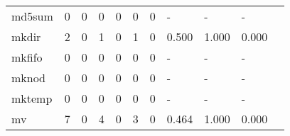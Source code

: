 \begin{longtable}{lp{1.2cm}p{1.2cm}p{1.2cm}p{1.2cm}p{1.2cm}p{1.2cm}p{1.2cm}p{1.2cm}p{1.2cm}p{1.2cm}}
md5sum    &                                     0 &                                                  0 &                                                0 &                                               0 &                                                0 &                                              0 &                                                  - &                                                  - &                                                  - \\
mkdir     &                                     2 &                                                  0 &                                                1 &                                               0 &                                                1 &                                              0 &                                              0.500 &                                              1.000 &                                              0.000 \\
mkfifo    &                                     0 &                                                  0 &                                                0 &                                               0 &                                                0 &                                              0 &                                                  - &                                                  - &                                                  - \\
mknod     &                                     0 &                                                  0 &                                                0 &                                               0 &                                                0 &                                              0 &                                                  - &                                                  - &                                                  - \\
mktemp    &                                     0 &                                                  0 &                                                0 &                                               0 &                                                0 &                                              0 &                                                  - &                                                  - &                                                  - \\
mv        &                                     7 &                                                  0 &                                                4 &                                               0 &                                                3 &                                              0 &                                              0.464 &                                              1.000 &                                              0.000 \\

\end{longtable}
